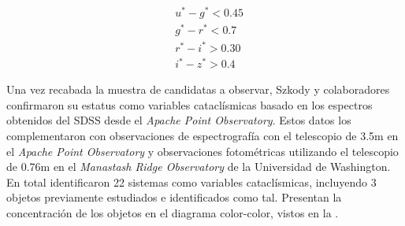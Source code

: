 \begin{equation}
	\begin{split}
		& u^* - g^* < 0.45 \\
		& g^* - r^* < 0.7 \\
		& r^* - i^* > 0.30 \\
		& i^* - z^* > 0.4
	\end{split}
	\label{muestra:szkody2002:criterioeqs}
\end{equation}

Una vez recabada la muestra de candidatas a observar, Szkody y colaboradores
confirmaron su estatus como variables cataclísmicas basado en los espectros
obtenidos del SDSS desde el \textit{Apache Point Observatory}. Estos datos los
complementaron con observaciones de espectrografía con el telescopio de 3.5m en
el \textit{Apache Point Observatory} y observaciones fotométricas utilizando el
telescopio de 0.76m en el \textit{Manastash Ridge Observatory} de la Universidad
de Washington. En total identificaron 22 sistemas como variables cataclísmicas,
incluyendo 3 objetos previamente estudiados e identificados como tal. Presentan
la concentración de los objetos en el diagrama color-color, vistos en la
. 

